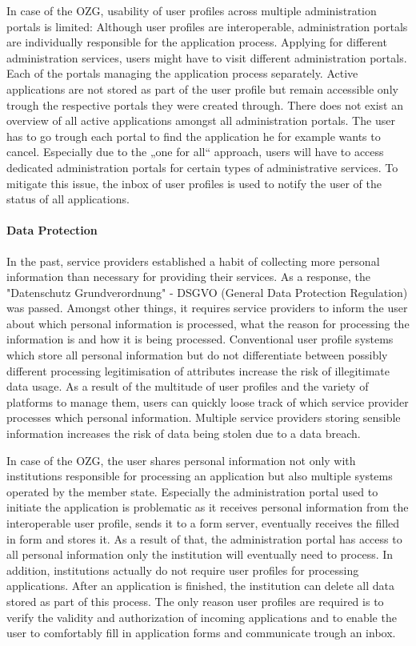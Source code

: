 In case of the OZG, usability of user profiles across multiple administration portals is limited: Although user profiles are interoperable, administration portals are individually responsible for the application process. Applying for different administration services, users might have to visit different administration portals. Each of the portals managing the application process separately. Active applications are not stored as part of the user profile but remain accessible only trough the respective portals they were created through. There does not exist an overview of all active applications amongst all administration portals. The user has to go trough each portal to find the application he for example wants to cancel. Especially due to the „one for all“ approach, users will have to access dedicated administration portals for certain types of administrative services. To mitigate this issue, the inbox of user profiles is used to notify the user of the status of all applications.

\paragraph{Data Protection}
In the past, service providers established a habit of collecting more personal information than necessary for providing their services. As a response, the "Datenschutz Grundverordnung" - DSGVO (General Data Protection Regulation) was passed. Amongst other things, it requires service providers to inform the user about which personal information is processed, what the reason for processing the information is and how it is being processed. Conventional user profile systems which store all personal information but do not differentiate between possibly different processing legitimisation of attributes increase the risk of illegitimate data usage. As a result of the multitude of user profiles and the variety of platforms to manage them, users can quickly loose track of which service provider processes which personal information. Multiple service providers storing sensible information increases the risk of data being stolen due to a data breach.


In case of the OZG, the user shares personal information not only with institutions responsible for processing an application but also multiple systems operated by the member state. Especially the administration portal used to initiate the application is problematic as it receives personal information from the interoperable user profile, sends it to a form server, eventually receives the filled in form and stores it. As a result of that, the administration portal has access to all personal information only the institution will eventually need to process. In addition, institutions actually do not require user profiles for processing applications. After an application is finished, the institution can delete all data stored as part of this process. The only reason user profiles are required is to verify the validity and authorization of incoming applications and to enable the user to comfortably fill in application forms and communicate trough an inbox. 

